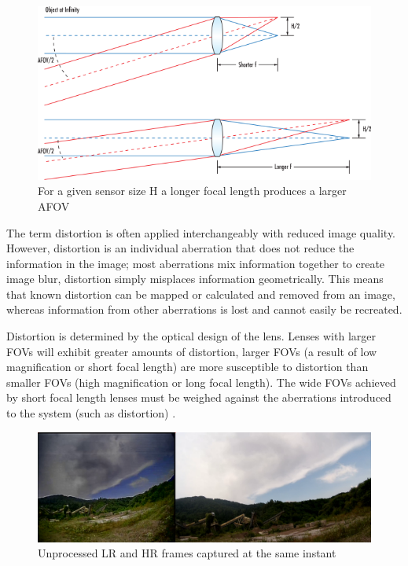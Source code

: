 \begin{figure}[h]
  \centering
  \includegraphics[scale=0.5]{figures/AFOV.png}
  \caption{For a given sensor size H a longer focal length produces a larger AFOV}
\end{figure}

The term distortion is often applied interchangeably with reduced image quality. However, distortion is an individual aberration that does not reduce the information in the image; most aberrations mix information together to create image blur, distortion simply misplaces information geometrically. This means that known distortion can be mapped or calculated and removed from an image, whereas information from other aberrations is lost and cannot easily be recreated.

Distortion is determined by the optical design of the lens. Lenses with larger FOVs will exhibit greater amounts of distortion, larger FOVs (a result of low magnification or short focal length) are more susceptible to distortion than smaller FOVs (high magnification or long focal length). The wide FOVs achieved by short focal length lenses must be weighed against the aberrations introduced to the system (such as distortion) \cite{distortion}.

\begin{figure}[h]
  \centering
  \includegraphics[width=1\textwidth]{figures/OG_sbs.png}
  \caption{Unprocessed LR and HR frames captured at the same instant}
  \label{img:og_sbs}
\end{figure}

